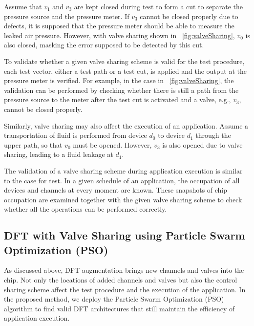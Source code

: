 Assume that $v_1$ and $v_3$ are kept closed during test to form a cut to
separate the pressure source and the pressure meter.  If $v_3$ cannot be
closed properly due to defects, it is supposed that the pressure 
meter should be able to measure
the leaked air pressure. However, with valve sharing shown in
\figname~\ref{fig:valveSharing}, $v_0$ is also closed, masking the error
supposed to be detected by this cut.

To validate whether a given valve sharing scheme is valid for the test
procedure, each test vector, either a test path or a test cut, is applied
and the output at the pressure meter is verified. For example, in the
case in \figname~\ref{fig:valveSharing}, the validation can be performed
by checking whether there is still a path from the pressure source to the
meter after the test cut is activated and a valve, e.g., $v_3$, cannot be
closed properly. 

Similarly, valve sharing may also affect the execution of an application.
Assume a transportation of fluid is performed from device $d_0$ to device
$d_1$ through the upper path, so that $v_0$ must be opened. However, 
$v_3$ is also opened due to valve sharing, leading to a fluid leakage at $d_1$.

The validation of a valve sharing scheme during application execution is similar
to the case for test. In a given schedule of an application, 
the occupation of all devices and channels at every moment are known. 
These snapshots of
chip occupation are examined together with the given valve sharing scheme
to check whether all the operations can be performed correctly.

\subsection{DFT with Valve Sharing using Particle Swarm Optimization (PSO)}

As discussed above, DFT augmentation brings new channels and valves into
the chip. Not only the locations of added channels and valves but also the
control sharing scheme affect the test procedure and the execution of the
application. In the proposed method, we deploy the Particle Swarm Optimization
(PSO) algorithm to find valid DFT architectures that still maintain the
efficiency of application execution.

